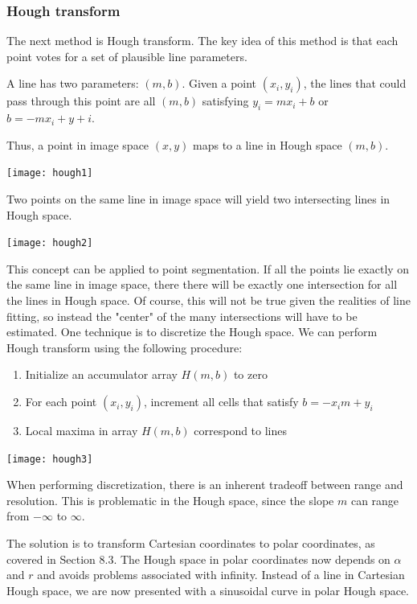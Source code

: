 \documentclass[twoside]{article}
\begin{document}
\subsubsection{Hough transform}
The next method is Hough transform. The key idea of this method is that each point votes for a set of plausible line parameters.

A line has two parameters: $(m,b)$. Given a point $(x_i,y_i)$, the lines that could pass through this point are all $(m,b)$ satisfying $y_i=mx_i+b$ or $b=-mx_i+y+i$.

Thus, a point in image space $(x,y)$ maps to a line in Hough space $(m,b)$.

\begin{center}
	\texttt{[image: hough1]}
\end{center}

Two points on the same line in image space will yield two intersecting lines in Hough space.

\begin{center}
	\texttt{[image: hough2]}
\end{center}

This concept can be applied to point segmentation. If all the points lie exactly on the same line in image space, there there will be exactly one intersection for all the lines in Hough space. Of course, this will not be true given the realities of line fitting, so instead the "center" of the many intersections will have to be estimated. One technique is to discretize the Hough space. We can perform Hough transform using the following procedure:

\begin{enumerate}
\item Initialize an accumulator array $H(m,b)$ to zero
\item For each point $(x_i, y_i)$, increment all cells that satisfy $b = -x_i m + y_i$
\item Local maxima in array $H(m,b)$ correspond to lines
\end{enumerate}

\begin{center}
	\texttt{[image: hough3]}
\end{center}

When performing discretization, there is an inherent tradeoff between range and resolution. This is problematic in the Hough space, since the slope $m$ can range from $-\infty$ to $\infty$.

The solution is to transform Cartesian coordinates to polar coordinates, as covered in Section 8.3. The Hough space in polar coordinates now depends on $\alpha$ and $r$ and avoids problems associated with infinity. Instead of a line in Cartesian Hough space, we are now presented with a sinusoidal curve in polar Hough space.
\end{document}
